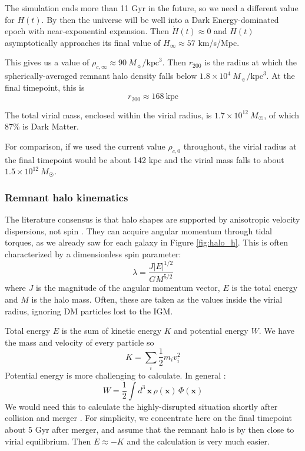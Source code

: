 \documentclass[twocolumn]{aastex63}
\newcommand{\todo}{\color{red}{TODO}\color{black}\hspace{2mm}}
\begin{document}
The simulation ends more than 11 Gyr in the future, so we need a different value for $H(t)$. By then the universe will be well into a Dark Energy-dominated epoch with near-exponential expansion. Then $\dot{H}(t) \approx 0$ and $H(t)$ asymptotically approaches its final value of $H_{\infty} \approx 57$ km/s/Mpc.

This gives us a value of $\rho_{c,\infty} \approx 90\ M_\sun/\text{kpc}^3$. Then $r_{200}$ is the radius at which the spherically-averaged remnant halo density falls below $1.8 \times 10^4\ M_\sun/\text{kpc}^3$. At the final timepoint, this is 
\[ r_{200} \approx 168\ \text{kpc} \]

The total virial mass, enclosed within the virial radius, is $1.7 \times 10^{12}\ M_\Sun$, of which 87\% is Dark Matter.

For comparison, if we used the current value $\rho_{c,0}$ throughout, the virial radius at the final timepoint would be about 142 kpc and the virial mass falls to about $1.5 \times 10^{12}\ M_\Sun$. \todo{what fraction of precursor galaxies?}

\todo{Some discussion would be useful!}


\subsubsection{Remnant halo kinematics}

The literature consensus is that halo shapes are supported by anisotropic velocity dispersions, not spin \citep{frenk_dark_2012}. They can acquire angular momentum through tidal torques, as we already saw for each galaxy in Figure \ref{fig:halo_h}. This is often characterized by a dimensionless spin parameter:
\[ \lambda = \frac{J |E|^{1/2}}{G M^{5/2}} \]
where $J$ is the magnitude of the angular momentum vector, $E$ is the total energy and $M$ is the halo mass. Often, these are taken as the values inside the virial radius, ignoring DM particles lost to the IGM.

Total energy $E$ is the sum of kinetic energy $K$ and potential energy $W$. We have the mass and velocity of every particle so 
\[ K = \sum_i \frac{1}{2} m_i v_i^2 \]
Potential energy is more challenging to calculate. In general \citep[section 2.1]{binney_galactic_2008}:
\[ W = \frac{1}{2} \int d^3\, \mathbf{x}\, \rho(\mathbf{x})\, \Phi(\mathbf{x}) \]
We would need this to calculate the highly-disrupted situation shortly after collision and merger \citep[section 8.2]{binney_galactic_2008}. For simplicity, we concentrate here on the final timepoint about 5 Gyr after merger, and assume that the remnant halo is by then close to virial equilibrium. Then $E \approx -K$ and the calculation is very much easier.
\end{document}
